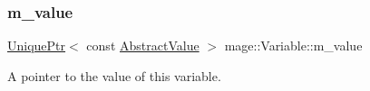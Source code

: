 \subsubsection{\texorpdfstring{m\+\_\+value}{m\_value}}
{\footnotesize\ttfamily \hyperlink{namespacemage_a8c307fbcc33bce9b7f2aa4c26c3b95cf}{Unique\+Ptr}$<$ const \hyperlink{structmage_1_1_variable_1_1_abstract_value}{Abstract\+Value} $>$ mage\+::\+Variable\+::m\+\_\+value\hspace{0.3cm}{\ttfamily [private]}}

A pointer to the value of this variable. 